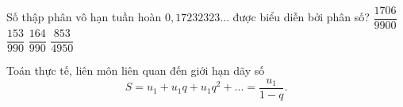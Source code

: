 \begin{ex}%
	Số thập phân vô hạn tuần hoàn $0{,}17232323\ldots$ được biểu diễn bởi phân số?
	\choice
	{$\dfrac{1706}{9900}$}
	{$\dfrac{153}{990}$}
	{$\dfrac{164}{990}$}
	{\True $\dfrac{853}{4950}$}
\end{ex}

\begin{dang}{Toán thực tế, liên môn liên quan đến giới hạn dãy số}
	$$S=u_1+u_1q+u_1q^2+...=\dfrac{u_1}{1-q}.$$
\end{dang}

